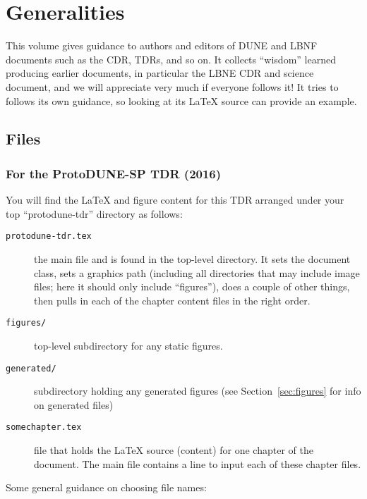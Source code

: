 \chapter{Generalities}
\label{ch:generalities}

This volume gives guidance to authors and editors of DUNE and LBNF documents such as the CDR, TDRs, and so on. It collects ``wisdom'' learned 
producing earlier documents, in particular the LBNE CDR and science document, and we will appreciate 
very much if everyone follows it!  It tries to follows its own guidance, so looking at its \LaTeX{} source can 
provide an example.  

\section{Files}
\label{sec:files}

\subsection{For the ProtoDUNE-SP TDR (2016)}
\label{ssec:files-pdunesp-tdr}

You will find the \LaTeX{} and figure content for this TDR
arranged under your top ``protodune-tdr'' directory as follows:

\begin{description}
\item[\texttt{protodune-tdr.tex}] the main file and is found in the top-level
  directory. It sets the document class, sets a graphics path (including all directories that may include image files; here it should only include ``figures''), does a couple of other things, then pulls in each of the chapter content files in the right order.
\item[\texttt{figures/}] top-level subdirectory for any static figures.
\item[\texttt{generated/}] subdirectory holding any generated
  figures (see Section~\ref{sec:figures} for info on generated files)
\item[\texttt{somechapter.tex}] file that holds the LaTeX source (content) for one
  chapter of the document. The main file contains a line to input each of these chapter files.
\end{description}

Some general guidance on choosing file names:

